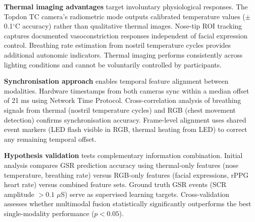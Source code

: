 \textbf{Thermal imaging advantages} target involuntary physiological responses. The Topdon TC camera's radiometric mode outputs calibrated temperature values ($\pm$0.1$^\circ$C accuracy) rather than qualitative thermal images. Nose-tip ROI tracking captures documented vasoconstriction responses independent of facial expression control. Breathing rate estimation from nostril temperature cycles provides additional autonomic indicators. Thermal imaging performs consistently across lighting conditions and cannot be voluntarily controlled by participants.

\textbf{Synchronisation approach} enables temporal feature alignment between modalities. Hardware timestamps from both cameras sync within a median offset of 21 ms using Network Time Protocol. Cross-correlation analysis of breathing signals from thermal (nostril temperature cycles) and RGB (chest movement detection) confirms synchronisation accuracy. Frame-level alignment uses shared event markers (LED flash visible in RGB, thermal heating from LED) to correct any remaining temporal offset.

\textbf{Hypothesis validation} tests complementary information combination. Initial analysis compares GSR prediction accuracy using thermal-only features (nose temperature, breathing rate) versus RGB-only features (facial expressions, rPPG heart rate) versus combined feature sets. Ground truth GSR events (SCR amplitude $>0.1$ $\mu$S) serve as supervised learning targets. Cross-validation assesses whether multimodal fusion statistically significantly outperforms the best single-modality performance ($p < 0.05$).

